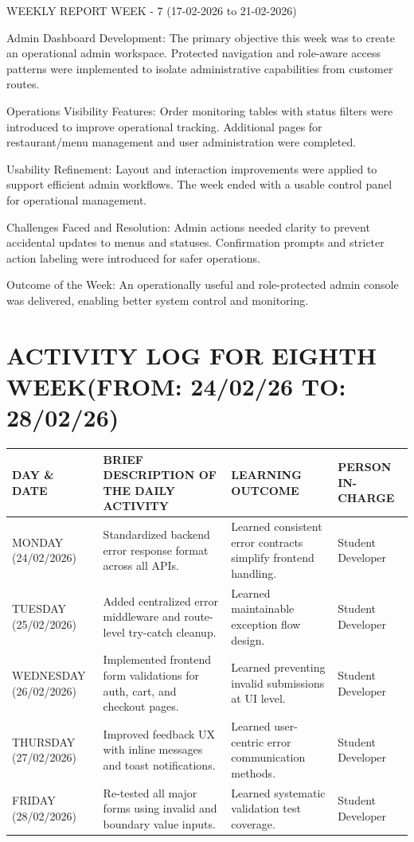 \documentclass[12pt,a4paper]{report}
\begin{document}
WEEKLY REPORT
WEEK - 7 (17-02-2026 to 21-02-2026)

Admin Dashboard Development:
The primary objective this week was to create an operational admin workspace. Protected navigation and role-aware access patterns were implemented to isolate administrative capabilities from customer routes.

Operations Visibility Features:
Order monitoring tables with status filters were introduced to improve operational tracking. Additional pages for restaurant/menu management and user administration were completed.

Usability Refinement:
Layout and interaction improvements were applied to support efficient admin workflows. The week ended with a usable control panel for operational management.

Challenges Faced and Resolution:
Admin actions needed clarity to prevent accidental updates to menus and statuses. Confirmation prompts and stricter action labeling were introduced for safer operations.

Outcome of the Week:
An operationally useful and role-protected admin console was delivered, enabling better system control and monitoring.

\section*{ACTIVITY LOG FOR EIGHTH WEEK(FROM: 24/02/26 TO: 28/02/26)}
\begin{longtable}{|p{2.2cm}|p{5.2cm}|p{4.3cm}|p{3.2cm}|}
\hline
\textbf{DAY \& DATE} & \textbf{BRIEF DESCRIPTION OF THE DAILY ACTIVITY} & \textbf{LEARNING OUTCOME} & \textbf{PERSON IN- CHARGE} \\
\hline
MONDAY (24/02/2026) & Standardized backend error response format across all APIs. & Learned consistent error contracts simplify frontend handling. & Student Developer \\
\hline
TUESDAY (25/02/2026) & Added centralized error middleware and route-level try-catch cleanup. & Learned maintainable exception flow design. & Student Developer \\
\hline
WEDNESDAY (26/02/2026) & Implemented frontend form validations for auth, cart, and checkout pages. & Learned preventing invalid submissions at UI level. & Student Developer \\
\hline
THURSDAY (27/02/2026) & Improved feedback UX with inline messages and toast notifications. & Learned user-centric error communication methods. & Student Developer \\
\hline
FRIDAY (28/02/2026) & Re-tested all major forms using invalid and boundary value inputs. & Learned systematic validation test coverage. & Student Developer \\
\hline
\end{longtable}
\end{document}
